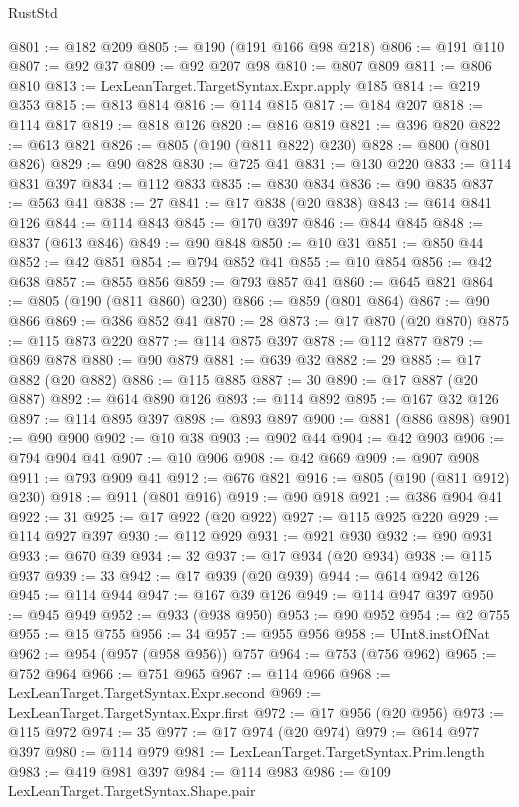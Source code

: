\begin{lexlean}{RustStd}
\begin{coremodule}
@801 := @182 @209
@805 := @190 (@191 @166 @98 @218)
@806 := @191 @110
@807 := @92 @37
@809 := @92 @207 @98
@810 := @807 @809
@811 := @806 @810
@813 := LexLeanTarget.TargetSyntax.Expr.apply @185
@814 := @219 @353
@815 := @813 @814
@816 := @114 @815
@817 := @184 @207
@818 := @114 @817
@819 := @818 @126
@820 := @816 @819
@821 := @396 @820
@822 := @613 @821
@826 := @805 (@190 (@811 @822) @230)
@828 := @800 (@801 @826)
@829 := @90 @828
@830 := @725 @41
@831 := @130 @220
@833 := @114 @831 @397
@834 := @112 @833
@835 := @830 @834
@836 := @90 @835
@837 := @563 @41
@838 := 27
@841 := @17 @838 (@20 @838)
@843 := @614 @841 @126
@844 := @114 @843
@845 := @170 @397
@846 := @844 @845
@848 := @837 (@613 @846)
@849 := @90 @848
@850 := @10 @31
@851 := @850 @44
@852 := @42 @851
@854 := @794 @852 @41
@855 := @10 @854
@856 := @42 @638
@857 := @855 @856
@859 := @793 @857 @41
@860 := @645 @821
@864 := @805 (@190 (@811 @860) @230)
@866 := @859 (@801 @864)
@867 := @90 @866
@869 := @386 @852 @41
@870 := 28
@873 := @17 @870 (@20 @870)
@875 := @115 @873 @220
@877 := @114 @875 @397
@878 := @112 @877
@879 := @869 @878
@880 := @90 @879
@881 := @639 @32
@882 := 29
@885 := @17 @882 (@20 @882)
@886 := @115 @885
@887 := 30
@890 := @17 @887 (@20 @887)
@892 := @614 @890 @126
@893 := @114 @892
@895 := @167 @32 @126
@897 := @114 @895 @397
@898 := @893 @897
@900 := @881 (@886 @898)
@901 := @90 @900
@902 := @10 @38
@903 := @902 @44
@904 := @42 @903
@906 := @794 @904 @41
@907 := @10 @906
@908 := @42 @669
@909 := @907 @908
@911 := @793 @909 @41
@912 := @676 @821
@916 := @805 (@190 (@811 @912) @230)
@918 := @911 (@801 @916)
@919 := @90 @918
@921 := @386 @904 @41
@922 := 31
@925 := @17 @922 (@20 @922)
@927 := @115 @925 @220
@929 := @114 @927 @397
@930 := @112 @929
@931 := @921 @930
@932 := @90 @931
@933 := @670 @39
@934 := 32
@937 := @17 @934 (@20 @934)
@938 := @115 @937
@939 := 33
@942 := @17 @939 (@20 @939)
@944 := @614 @942 @126
@945 := @114 @944
@947 := @167 @39 @126
@949 := @114 @947 @397
@950 := @945 @949
@952 := @933 (@938 @950)
@953 := @90 @952
@954 := @2 @755
@955 := @15 @755
@956 := 34
@957 := @955 @956
@958 := UInt8.instOfNat
@962 := @954 (@957 (@958 @956)) @757
@964 := @753 (@756 @962)
@965 := @752 @964
@966 := @751 @965
@967 := @114 @966
@968 := LexLeanTarget.TargetSyntax.Expr.second
@969 := LexLeanTarget.TargetSyntax.Expr.first
@972 := @17 @956 (@20 @956)
@973 := @115 @972
@974 := 35
@977 := @17 @974 (@20 @974)
@979 := @614 @977 @397
@980 := @114 @979
@981 := LexLeanTarget.TargetSyntax.Prim.length
@983 := @419 @981 @397
@984 := @114 @983
@986 := @109 LexLeanTarget.TargetSyntax.Shape.pair

\end{coremodule}
\end{lexlean}
